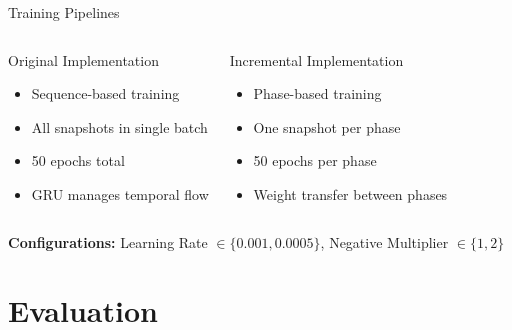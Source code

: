 \documentclass[aspectratio=169,xcolor=dvipsnames]{beamer}
\begin{document}
\begin{frame}{Training Pipelines }
	\begin{columns}[t]
		\begin{block}{Original Implementation}
			\begin{itemize}
				\item Sequence-based training
				\item All snapshots in single batch
				\item 50 epochs total
				\item GRU manages temporal flow
			\end{itemize}
		\end{block}

		\begin{block}{Incremental Implementation}
			\begin{itemize}
				\item Phase-based training
				\item One snapshot per phase
				\item 50 epochs per phase
				\item Weight transfer between phases
			\end{itemize}
		\end{block}
	\end{columns}

	\vspace{1em}

	\centering
	\textbf{Configurations:} Learning Rate $\in \{0.001, 0.0005\}$, Negative Multiplier $\in \{1, 2\}$
\end{frame}

\section{Evaluation}
\end{document}
